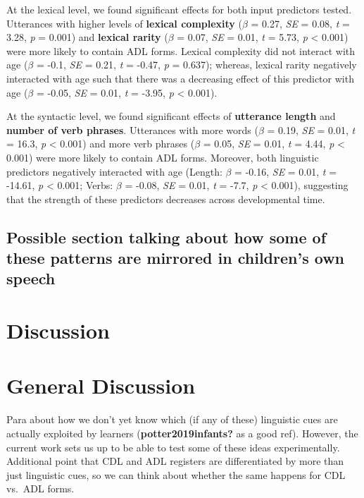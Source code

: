 \documentclass[10pt, letterpaper]{article}
\begin{document}
At the lexical level, we found significant effects for both input
predictors tested. Utterances with higher levels of \textbf{lexical
complexity} (\(\beta\) = 0.27, \emph{SE} = 0.08, \emph{t} = 3.28,
\emph{p} = 0.001) and \textbf{lexical rarity} (\(\beta\) = 0.07,
\emph{SE} = 0.01, \emph{t} = 5.73, \emph{p} \textless{} 0.001) were more
likely to contain ADL forms. Lexical complexity did not interact with
age (\(\beta\) = -0.1, \emph{SE} = 0.21, \emph{t} = -0.47, \emph{p} =
0.637); whereas, lexical rarity negatively interacted with age such that
there was a decreasing effect of this predictor with age (\(\beta\) =
-0.05, \emph{SE} = 0.01, \emph{t} = -3.95, \emph{p} \textless{} 0.001).

At the syntactic level, we found significant effects of
\textbf{utterance length} and \textbf{number of verb phrases}.
Utterances with more words (\(\beta\) = 0.19, \emph{SE} = 0.01, \emph{t}
= 16.3, \emph{p} \textless{} 0.001) and more verb phrases (\(\beta\) =
0.05, \emph{SE} = 0.01, \emph{t} = 4.44, \emph{p} \textless{} 0.001)
were more likely to contain ADL forms. Moreover, both linguistic
predictors negatively interacted with age (Length: \(\beta\) = -0.16,
\emph{SE} = 0.01, \emph{t} = -14.61, \emph{p} \textless{} 0.001; Verbs:
\(\beta\) = -0.08, \emph{SE} = 0.01, \emph{t} = -7.7, \emph{p}
\textless{} 0.001), suggesting that the strength of these predictors
decreases across developmental time.

\hypertarget{possible-section-talking-about-how-some-of-these-patterns-are-mirrored-in-childrens-own-speech}{%
\subsection{Possible section talking about how some of these patterns
are mirrored in children's own
speech}\label{possible-section-talking-about-how-some-of-these-patterns-are-mirrored-in-childrens-own-speech}}

\hypertarget{discussion-1}{%
\section{Discussion}\label{discussion-1}}

\hypertarget{general-discussion}{%
\section{General Discussion}\label{general-discussion}}

Para about how we don't yet know which (if any of these) linguistic cues
are actually exploited by learners (\textbf{potter2019infants?} as a
good ref). However, the current work sets us up to be able to test some
of these ideas experimentally. Additional point that CDL and ADL
registers are differentiated by more than just linguistic cues, so we
can think about whether the same happens for CDL vs.~ADL forms.
\end{document}
